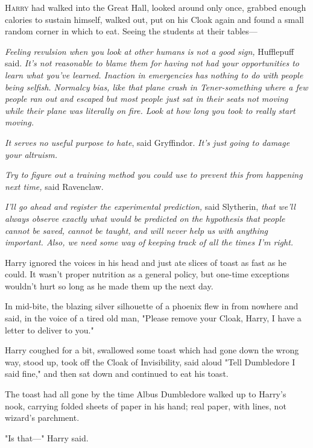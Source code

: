 
\lettrine{H}{arry} had walked
into the Great Hall, looked around only once, grabbed enough calories to
sustain himself, walked out, put on his Cloak again and found a small random
corner in which to eat. Seeing the students at their tables---

\emph{Feeling revulsion when you look at other humans is not a good sign,}
Hufflepuff said. \emph{It's not reasonable to blame them for having not had
your opportunities to learn what you've learned. Inaction in emergencies has
nothing to do with people being selfish. Normalcy bias, like that plane crash
in Tener-something where a few people ran out and escaped but most people just
sat in their seats not moving while their plane was literally on fire. Look at
how long \emph{you} took to really start moving.}

\emph{It serves no useful purpose to hate}, said Gryffindor. \emph{It's just
going to damage your altruism.}

\emph{Try to figure out a training method you could use to prevent this from
happening next time,} said Ravenclaw.

\emph{I'll go ahead and register the experimental prediction,} said Slytherin,
\emph{that we'll always observe exactly what would be predicted on the
hypothesis that people cannot be saved, cannot be taught, and will never help
us with anything important. Also, we need some way of keeping track of all the
times I'm right.}

Harry ignored the voices in his head and just ate slices of toast as fast as he
could. It wasn't proper nutrition as a general policy, but one-time exceptions
wouldn't hurt so long as he made them up the next day.

In mid-bite, the blazing silver silhouette of a phoenix flew in from nowhere
and said, in the voice of a tired old man, "Please remove your Cloak, Harry, I
have a letter to deliver to you."

Harry coughed for a bit, swallowed some toast which had gone down the wrong
way, stood up, took off the Cloak of Invisibility, said aloud "Tell Dumbledore
I said fine," and then sat down and continued to eat his toast.

The toast had all gone by the time Albus Dumbledore walked up to Harry's nook,
carrying folded sheets of paper in his hand; real paper, with lines, not
wizard's parchment.

"Is that---" Harry said.

